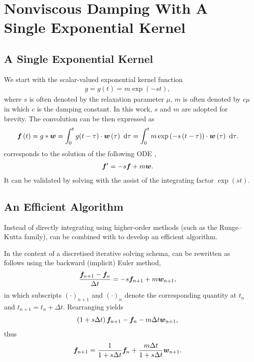 \section{Nonviscous Damping With A Single Exponential Kernel}
\subsection{A Single Exponential Kernel}
We start with the scalar-valued exponential kernel function
\begin{gather}
g=g\left(t\right)=m\exp\left(-st\right),
\end{gather}
where $s$ is often denoted by the relaxation parameter $\mu$, $m$ is often denoted by $c\mu$ in which $c$ is the damping constant. In this work, $s$ and $m$ are adopted for brevity.
The convolution can be then expressed as
\begin{gather}\label{eq:single_conv}
\bm{f}\left(t\right)=g*\bm{w}=\int_0^tg(t-\tau)\cdot\bm{w}\left(\tau\right)~\mathrm{d}\tau=\int_0^tm\exp\left(-s\left(t-\tau\right)\right)\cdot\bm{w}\left(\tau\right)~\mathrm{d}\tau.
\end{gather}
 corresponds to the solution of the following ODE \citep[see, e.g.,][\S~80]{Zwillinger2021},
\begin{gather}\label{eq:single_conv_ode}
\bm{f}'=-s\bm{f}+m\bm{w}.
\end{gather}
It can be validated by solving  with the assist of the integrating factor $\exp\left(st\right)$.
\subsection{An Efficient Algorithm}
Instead of directly integrating  using higher-order methods (such as the Runge--Kutta family),  can be combined with  to develop an efficient algorithm.

In the context of a discretised iterative solving schema,  can be rewritten as follows using the backward (implicit) Euler method,
\begin{gather}\label{eq:discretised_a}
\dfrac{\bm{f}_{n+1}-\bm{f}_n}{\Delta{}t}=-s\bm{f}_{n+1}+m\bm{w}_{n+1},
\end{gather}
in which subscripts $\left(\cdot\right)_{n+1}$ and $\left(\cdot\right)_n$ denote the corresponding quantity at $t_n$ and $t_{n+1}=t_n+\Delta{}t$.
Rearranging  yields
\begin{gather}\label{eq:discretised_b}
\left(1+s\Delta{}t\right)\bm{f}_{n+1}-\bm{f}_n-m\Delta{}t\bm{w}_{n+1},
\end{gather}
thus
\begin{gather}\label{eq:discretised_c}
\bm{f}_{n+1}=\dfrac{1}{1+s\Delta{}t}\bm{f}_n+\dfrac{m\Delta{}t}{1+s\Delta{}t}\bm{w}_{n+1}.
\end{gather}

